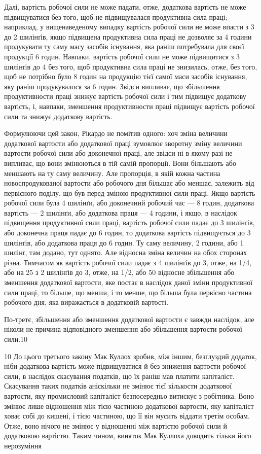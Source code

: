 Далі, вартість робочої сили не може падати, отже, додаткова
вартість не може підвищуватися без того, щоб не підвищувалася
продуктивна сила праці; наприклад, у вищенаведеному випадку
вартість робочої сили не може впасти з 3 до 2 шилінґів, якщо
підвищена продуктивна сила праці не дозволяє за 4 години продукувати
ту саму масу засобів існування, яка раніш потребувала
для своєї продукції 6 годин. Навпаки, вартість робочої сили не
може підвищитися з 3 шилінґів до 4 без того, щоб продуктивна
сила праці не знизилась, отже, без того, щоб не потрібно було
8 годин на продукцію тієї самої маси засобів існування, яку раніш
продукувалося за 6 годин. Звідси випливає, що збільшення продуктивности
праці знижує вартість робочої сили і тим підвищує
додаткову вартість, і, навпаки, зменшення продуктивности праці
підвищує вартість робочої сили та знижує додаткову вартість.

Формулюючи цей закон, Рікардо не помітив одного: хоч зміна
величини додаткової вартости або додаткової праці зумовлює
зворотну зміну величини вартости робочої сили або доконечної
праці, але звідси ні в якому разі не випливає, що вони змінюються
в тій самій пропорції. Вони більшають або меншають на ту саму
величину. Але пропорція, в якій кожна частина новоспродукованої
вартости або робочого дня більшає або меншає, залежить
від первісного поділу, що був перед зміною продуктивної сили
праці. Якщо вартість робочої сили була 4 шилінґи, або доконечний
робочий час — 8 годин, додаткова вартість — 2 шилінґи,
або додаткова праця — 4 години, і якщо, в наслідок підвищення
продуктивної сили праці, вартість робочої сили падає
до 3 шилінґів, або доконечна праця падає до 6 годин, то додаткова
вартість підвищується до 3 шилінґів, або додаткова праця
до 6 годин. Ту саму величину, 2 години, або 1 шилінґ, там додано,
тут однято. Але відносна зміна величин на обох сторонах
різна. Тимчасом як вартість робочої сили падає з 4 шилінґів
до 3, отже, на 1/4, або на 25%
з 2 шилінґів до 3, отже, на 1/2, або 50%
відносне збільшення або зменшення додаткової вартости, яке
постає в наслідок даної зміни продуктивної сили праці, то більше,
що менша, і то менше, що більша була первісно частина робочого
дня, яка виражається в додатковій вартості.

По-третє, збільшення або зменшення додаткової вартости є
завжди наслідок, але ніколи не причина відповідного зменшення
або збільшення вартости робочої сили.10

10    До цього третього закону Мак Куллох зробив, між іншим, безглуздий
додаток, ніби додаткова вартість може підвищуватися й без зниження
вартости робочої сили, в наслідок скасування податків, що їх раніш мав
платити капіталіст. Скасування таких податків аніскільки не змінює
тієї кількости додаткової вартости, яку промисловий капіталіст безпосередньо
витискує з робітника. Воно змінює лише відношення між тією
частиною додаткової вартости, яку капіталіст ховає собі до кишені, і
тією частиною, що її він мусить віддати третім особам. Отже, воно нічого не
змінює у відношенні між вартістю робочої сили й додатковою вартістю.
Таким чином, виняток Мак Куллоха доводить тільки його нерозуміння
